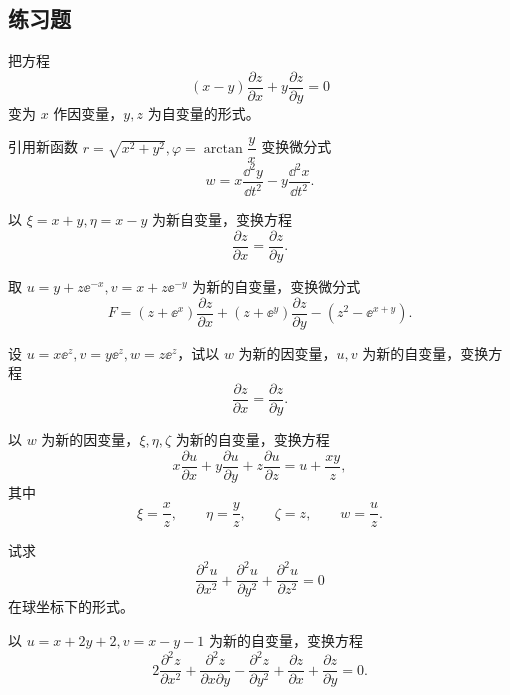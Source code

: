 \subsection{练习题}

\begin{xexercise}[1]
把方程
  \[
    (x-y)\frac{\partial z}{\partial x}+y\frac{\partial z}{\partial y}=0
  \]
  变为 $x$ 作因变量，$y,z$ 为自变量的形式。
\end{xexercise}

\begin{xexercise}[2]
引用新函数 $r=\sqrt{x^2+y^2},\varphi=\arctan\dfrac yx$ 变换微分式
  \[
    w=x\frac{\dd^2y}{\dd t^2}-y\frac{\dd^2x}{\dd t^2}.
  \]
\end{xexercise}

\begin{xexercise}[3]
以 $\xi=x+y,\eta=x-y$ 为新自变量，变换方程
  \[
    \frac{\partial z}{\partial x}=\frac{\partial z}{\partial y}.
  \]
\end{xexercise}

\begin{xexercise}[4]
取 $u=y+z\ee^{-x},v=x+z\ee^{-y}$ 为新的自变量，变换微分式
  \[
    F=(z+\ee^x)\frac{\partial z}{\partial x}
    +(z+\ee^y)\frac{\partial z}{\partial y}
    -(z^2-\ee^{x+y}).
  \]
\end{xexercise}

\begin{xexercise}[5]
设 $u=x\ee^z,v=y\ee^z,w=z\ee^z$，试以 $w$ 为新的因变量，$u,v$ 为新的自变量，变换方程
  \[
    \frac{\partial z}{\partial x}=\frac{\partial z}{\partial y}.
  \]
\end{xexercise}

\begin{xexercise}[6]
以 $w$ 为新的因变量，$\xi,\eta,\zeta$ 为新的自变量，变换方程
  \[
    x\frac{\partial u}{\partial x}+y\frac{\partial u}{\partial y}
    +z\frac{\partial u}{\partial z}=u+\frac{xy}{z},
  \]
  其中
  \[
    \xi=\frac xz,\qquad \eta=\frac yz,\qquad \zeta=z,\qquad w=\frac uz.
  \]
\end{xexercise}

\begin{xexercise}[7]
试求
  \[
    \frac{\partial^2u}{\partial x^2}+\frac{\partial^2u}{\partial y^2}+\frac{\partial^2u}{\partial z^2}=0
  \]
  在球坐标下的形式。
\end{xexercise}

\begin{xexercise}[8]
以 $u=x+2y+2,v=x-y-1$ 为新的自变量，变换方程
  \[
    2\frac{\partial^2z}{\partial x^2}
    +\frac{\partial^2z}{\partial x\partial y}
    -\frac{\partial^2z}{\partial y^2}
    +\frac{\partial z}{\partial x}
    +\frac{\partial z}{\partial y}=0.
  \]
\end{xexercise}

